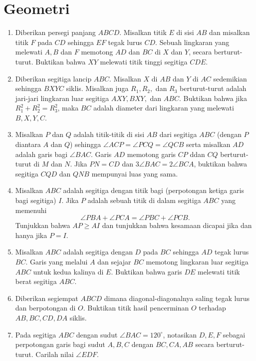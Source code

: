 \documentclass[12pt]{scrartcl}
\begin{document}
\section{Geometri}
\begin{enumerate}
	\item
	Diberikan persegi panjang $ABCD$. Misalkan titik $E$ di sisi $AB$ dan misalkan titik $F$ pada $CD$ sehingga $EF$ tegak lurus $CD$. Sebuah lingkaran yang melewati $A,B$ dan $F$ memotong $AD$ dan $BC$ di $X$ dan $Y$, secara berturut-turut. Buktikan bahwa $XY$ melewati titik tinggi segitiga $CDE$.
	
	\item
	Diberikan segitiga lancip $ABC$. Misalkan $X$ di $AB$ dan $Y$ di $AC$ sedemikian sehingga $BXYC$ siklis. Misalkan juga $R_1,R_2,$ dan $R_3$ berturut-turut adalah jari-jari lingkaran luar segitiga $AXY, BXY,$ dan $ABC$. Buktikan bahwa jika $R_1^2+R_2^2=R_3^2$, maka $BC$ adalah diameter dari lingkaran yang melewati $B,X,Y,C$.
	
	\item
	Misalkan $P$ dan $Q$ adalah titik-titik di sisi $AB$ dari segitiga $ABC$ (dengan $P$ diantara $A$ dan $Q$) sehingga $\angle ACP = \angle PCQ = \angle QCB$ serta misalkan $AD$ adalah garis bagi $\angle BAC$. Garis $AD$ memotong garis $CP$ ddan $CQ$ berturut-turut di $M$ dan $N$. Jika $PN=CD$ dan $3\angle BAC=2\angle BCA$, buktikan bahwa segitiga $CQD$ dan $QNB$ mempunyai luas yang sama.
	
	\item
	Misalkan $ABC$ adalah segitiga dengan titik bagi (perpotongan ketiga garis bagi segitiga) $I$. Jika $P$ adalah sebuah titik di dalam segitiga $ABC$ yang memenuhi
	\[
	\angle PBA + \angle PCA = \angle PBC + \angle PCB.
	\]
	Tunjukkan bahwa $AP \geq AI$ dan tunjukkan bahwa kesamaan dicapai jika dan hanya jika $P=I$. 
	
	\item
	Misalkan $ABC$ adalah segitiga dengan $D$ pada $BC$ sehingga $AD$ tegak lurus $BC$. Garis yang melalui $A$ dan sejajar $BC$ memotong lingkaran luar segitiga $ABC$ untuk kedua kalinya di $E$. Buktikan bahwa garis $DE$ melewati titik berat segitiga $ABC$.
	
	\item
	Diberikan segiempat $ABCD$ dimana diagonal-diagonalnya saling tegak lurus dan berpotongan di $O$. Buktikan titik hasil pencerminan $O$ terhadap $AB,BC,CD,DA$ siklis.
	
	\item
	Pada segitiga $ABC$ dengan sudut $\angle BAC = 120^\circ$, notasikan $D,E,F$ sebagai perpotongan garis bagi sudut $A,B,C$ dengan $BC,CA,AB$ secara berturut-turut. Carilah nilai $\angle EDF$.
	

\end{enumerate}
\end{document}
